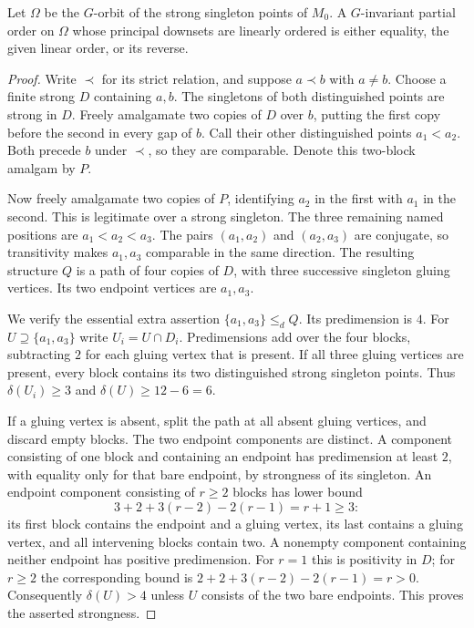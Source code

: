 \begin{lemma}
\label{G:treeorder}
Let $\Omega$ be the $G$-orbit of the strong singleton points of
$M_0$.  A $G$-invariant partial order on $\Omega$ whose principal
downsets are linearly ordered is either equality, the given
linear order, or its reverse.
\end{lemma}
\begin{proof}
Write $\prec$ for its strict relation, and suppose $a\prec b$
with $a\ne b$.  Choose a finite strong $D$ containing $a,b$.
The singletons of both distinguished points are strong in $D$.
Freely amalgamate two copies of $D$ over $b$, putting the first
copy before the second in every gap of $b$.  Call their other
distinguished points $a_1<a_2$.  Both precede $b$ under
$\prec$, so they are comparable.  Denote this two-block
amalgam by $P$.

Now freely amalgamate two copies of $P$, identifying $a_2$ in
the first with $a_1$ in the second.  This is legitimate over
a strong singleton.  The three remaining named positions are
$a_1<a_2<a_3$.  The pairs $(a_1,a_2)$ and $(a_2,a_3)$ are
conjugate, so transitivity makes $a_1,a_3$ comparable in the
same direction.  The resulting structure $Q$ is a path of
four copies of $D$, with three successive singleton gluing
vertices.  Its two endpoint vertices are $a_1,a_3$.

We verify the essential extra assertion
$\{a_1,a_3\}\le_d Q$.  Its predimension is $4$.
For $U\supseteq\{a_1,a_3\}$ write $U_i=U\cap D_i$.
Predimensions add over the four blocks, subtracting $2$ for
each gluing vertex that is present.  If all three gluing
vertices are present, every block contains its two distinguished
strong singleton points.  Thus $\delta(U_i)\ge3$ and
$\delta(U)\ge12-6=6$.

If a gluing vertex is absent, split the path at all absent
gluing vertices, and discard empty blocks.  The two endpoint
components are distinct.  A component consisting of one block
and containing an endpoint has predimension at least $2$,
with equality only for that bare endpoint, by strongness of
its singleton.  An endpoint component consisting of $r\ge2$
blocks has lower bound
\[
 3+2+3(r-2)-2(r-1)=r+1\ge3:
\]
its first block contains the endpoint and a gluing vertex,
its last contains a gluing vertex, and all intervening blocks
contain two.  A nonempty component containing neither endpoint
has positive predimension.  For $r=1$ this is positivity in
$D$; for $r\ge2$ the corresponding bound is
$2+2+3(r-2)-2(r-1)=r>0$.
Consequently $\delta(U)>4$ unless $U$ consists of the two
bare endpoints.  This proves the asserted strongness.


\end{proof}
